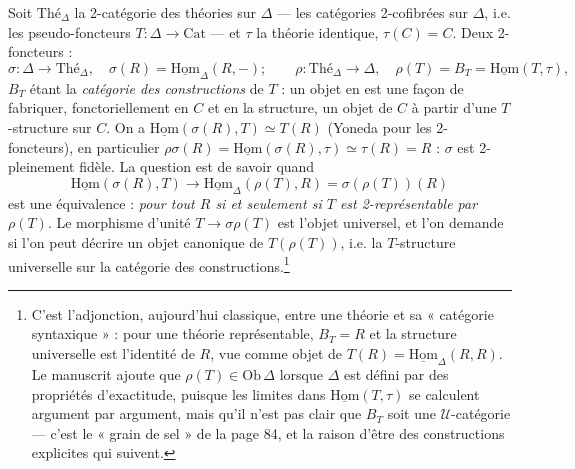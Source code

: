 \documentclass[11pt,a4paper]{article}
\begin{document}
Soit $\text{Thé}_{\Delta}$ la 2-catégorie des théories sur $\Delta$ — les
catégories 2-cofibrées sur $\Delta$, i.e. les pseudo-foncteurs $T : \Delta
\to \mathrm{Cat}$ — et $\tau$ la théorie identique, $\tau(C) = C$. Deux
2-foncteurs :
\[
\sigma : \Delta \to \text{Thé}_{\Delta}, \quad \sigma(R) = \underline{\mathrm{Hom}}
_{\Delta}(R, -) ; \qquad
\rho : \text{Thé}_{\Delta} \to \Delta, \quad \rho(T) = B_{T} = \underline{\mathrm{Hom}}
(T, \tau),
\]
$B_{T}$ étant la \emph{catégorie des constructions} de $T$ : un objet en
est une façon de fabriquer, fonctoriellement en $C$ et en la structure, un
objet de $C$ à partir d'une $T$-structure sur $C$. On a
$\underline{\mathrm{Hom}}(\sigma(R), T) \simeq T(R)$ (Yoneda pour les
2-foncteurs), en particulier $\rho\sigma(R) = \underline{\mathrm{Hom}}(\sigma
(R), \tau) \simeq \tau(R) = R$ : $\sigma$ est 2-pleinement fidèle. La
question est de savoir quand
\[
\underline{\mathrm{Hom}}(\sigma(R), T) \longrightarrow \underline{\mathrm{Hom}}
_{\Delta}(\rho(T), R) = \sigma(\rho(T))(R)
\]
est une équivalence : \emph{pour tout $R$ si et seulement si $T$ est
2-représentable par $\rho(T)$}. Le morphisme d'unité $T \to \sigma\rho(T)$
est l'objet universel, et l'on demande si l'on peut décrire un objet
canonique de $T(\rho(T))$, i.e. la $T$-structure universelle sur la
catégorie des constructions.\footnote{C'est l'adjonction, aujourd'hui
classique, entre une théorie et sa « catégorie syntaxique » : pour une
théorie représentable, $B_{T} = R$ et la structure universelle est
l'identité de $R$, vue comme objet de $T(R) = \underline{\mathrm{Hom}}_{
\Delta}(R, R)$. Le manuscrit ajoute que $\rho(T) \in \mathrm{Ob}\,\Delta$
lorsque $\Delta$ est défini par des propriétés d'exactitude, puisque les
limites dans $\underline{\mathrm{Hom}}(T, \tau)$ se calculent argument par
argument, mais qu'il n'est pas clair que $B_{T}$ soit une
$\mathcal{U}$-catégorie — c'est le « grain de sel » de la page 84, et la
raison d'être des constructions explicites qui suivent.}
\end{document}
